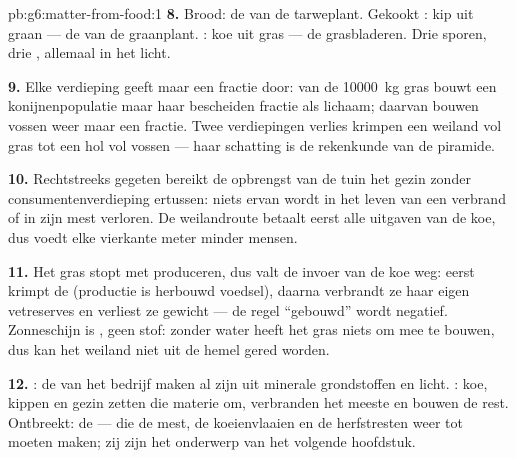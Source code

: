 \begin{solution}{pb:g6:matter-from-food:1}
\textbf{8.} Brood: de  van de tarweplant. Gekookt : kip uit
graan --- de  van de graanplant. : koe uit gras --- de
grasbladeren. Drie sporen, drie , allemaal in het licht.

\textbf{9.} Elke verdieping geeft maar een fractie door: van de
\qty{10000}{kg} gras bouwt een konijnenpopulatie maar haar bescheiden
fractie als lichaam; daarvan bouwen vossen weer maar een fractie. Twee
verdiepingen verlies krimpen een weiland vol gras tot een hol vol vossen
--- haar schatting is de rekenkunde van de piramide.

\textbf{10.} Rechtstreeks gegeten bereikt de opbrengst van de tuin het
gezin zonder consumentenverdieping ertussen: niets ervan wordt in het
leven van een  verbrand of in zijn mest verloren. De weilandroute
betaalt eerst alle uitgaven van de koe, dus voedt elke vierkante meter
minder mensen.

\textbf{11.} Het gras stopt met produceren, dus valt de invoer van de koe
weg: eerst krimpt de  (productie is herbouwd voedsel), daarna
verbrandt ze haar eigen vetreserves en verliest ze gewicht --- de regel
``gebouwd'' wordt negatief. Zonneschijn is , geen stof: zonder
water heeft het gras niets om mee te bouwen, dus kan het weiland niet uit
de hemel gered worden.

\textbf{12.} : de  van het bedrijf maken al zijn
 uit minerale grondstoffen en licht. : koe,
kippen en gezin zetten die materie om, verbranden het meeste en bouwen de
rest. Ontbreekt: de  --- die de mest, de koeienvlaaien en de
herfstresten weer tot  moeten maken; zij zijn het
onderwerp van het volgende hoofdstuk.
\end{solution}
